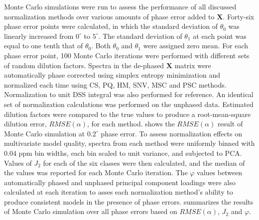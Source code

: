 \begin{doublespace}
Monte Carlo simulations were run to assess the performance of all discussed
normalization methods over various amounts of phase error added to
$\mathbf{X}$. Forty-six phase error points were calculated, in which the
standard deviation of $\theta_0$ was linearly increased from $0^\circ$ to
$5^\circ$. The standard deviation of $\theta_1$ at each point was equal to
one tenth that of $\theta_0$. Both $\theta_0$ and $\theta_1$ were assigned
zero mean. For each phase error point, 100 Monte Carlo iterations were
performed with different sets of random dilution factors. Spectra in the
de-phased $\mathbf{X}$ matrix were automatically phase corrected using simplex
entropy minimization and normalized each time using CS, PQ, HM, SNV, MSC and
PSC methods. Normalization to unit DSS integral was also performed for
reference. An identical set of normalization calculations was performed on the
unphased data. Estimated dilution factors were compared to the true values
to produce a root-mean-square dilution error, $RMSE(\alpha)$, for each method.
 shows the $RMSE(\alpha)$ result of Monte Carlo
simulation at $0.2^\circ$ phase error. To assess normalization effects on
multivariate model quality, spectra from each method were uniformly binned
with 0.04 ppm bin widths, each bin scaled to unit variance, and subjected
to PCA. Values of $J_2$ for each of the six classes were then calculated,
and the median of the values was reported for each Monte Carlo iteration.
The $\varphi$ values between automatically phased and unphased principal
component loadings were also calculated at each iteration to asses each
normalization method's ability to produce consistent models in the presence
of phase errors.  summarizes the results of Monte
Carlo simulation over all phase errors based on $RMSE(\alpha)$, $J_2$
and $\varphi$.
\end{doublespace}

